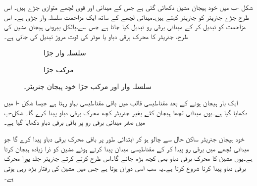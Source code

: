 شکل -ب میں خود ہیجان مشین دکھائی گئی ہے جس کے میدانی اور قوی لچھے متوازی جڑے ہیں۔ اس طرح جڑے جنریٹر کو  جنریٹر کہتے ہیں۔میدانی لچھے کے ساتھ ایک مزاحمت سلسلہ وار جڑی ہے۔ اس مزاحمت  کو تبدیل کر کے میدانی برقی رو تبدیل کیا جاتا ہے جس سے،بالکل بیرونی ہیجان مشین کی طرح، جنریٹر کا محرک برقی دباو یا موٹر کی قوت مروڑ تبدیل کی جاتی ہے۔
\begin{figure}
\centering
\begin{subfigure}{0.45\textwidth}
\centering
{}
\caption{سلسلہ وار جڑا}
\end{subfigure}%
\begin{subfigure}{0.45\textwidth}
\centering
{}
\caption{مرکب جڑا}
\end{subfigure}
\caption{سلسلہ وار اور مرکب جڑا خود ہیجان جنریٹر۔}
\label{شکل_یکسمتی_سلسلہ_وار_اور_مرکب}
\end{figure}
 ایک بار ہیجان ہونے کے بعد مقناطیسی قالب میں  باقی مقناطیسی بہاو رہتا ہے جیسا شکل -ا میں دکھایا گیا ہے۔یوں میدانی لچھا ہیجان کئے بغیر جنریٹر کچھ  محرک برقی دباو پیدا کرے گا۔   شکل-ب میں   صفر میدانی برقی رو پر باقی برقی دباو   دکھایا گیا ہے۔

 خود ہیجان جنریٹر ساکن حال سے چالو ہو کر  ابتدائی طور پر باقی محرک برقی دباو پیدا کرے گا جو میدانی لچھے میں برقی رو پیدا کر کے  مقناطیسی میدان پیدا کرتے ہوئے  مشین کو ذرا زیادہ ہیجان کرتا ہے۔یوں مشین کا محرک برقی دباو بھی کچھ بڑھ جائے گا۔اس طرح کرتے کرتے جنریٹر جلد پورا محرک برقی دباو پیدا کرنا شروع کرتا ہے۔یہ سب اسی دوران  ہوتا ہے جس میں مشین کی رفتار بڑھ رہی ہوتی ہے۔

